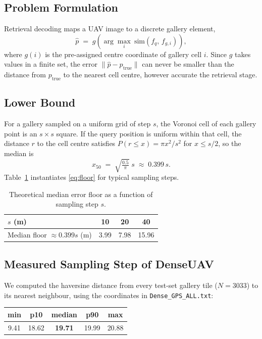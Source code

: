 \documentclass[journal]{IEEEtran}
\begin{document}
\subsection{Problem Formulation}
Retrieval decoding maps a UAV image to a discrete gallery element,
\begin{equation}
\hat{p} \;=\; g\!\left(\arg\max_{i}\ \mathrm{sim}\!\left(f_{q},\, f_{g,i}\right)\right),
\end{equation}
where $g(i)$ is the pre-assigned centre coordinate of gallery cell $i$. Since $g$ takes
values in a finite set, the error $\lVert \hat{p}-p_{\text{true}} \rVert$ can never be
smaller than the distance from $p_{\text{true}}$ to the nearest cell centre, however
accurate the retrieval stage.

\subsection{Lower Bound}
For a gallery sampled on a uniform grid of step $s$, the Voronoi cell of each gallery
point is an $s \times s$ square. If the query position is uniform within that cell, the
distance $r$ to the cell centre satisfies $P(r \le x) = \pi x^{2}/s^{2}$ for
$x \le s/2$, so the median is
\begin{equation}
x_{50} \;=\; \sqrt{\tfrac{0.5}{\pi}}\; s \;\approx\; 0.399\,s .
\label{eq:floor}
\end{equation}
Table~\ref{tab:floor} instantiates \eqref{eq:floor} for typical sampling steps.

\begin{table}[!t]
\centering
\caption{Theoretical median error floor as a function of sampling step $s$.}
\label{tab:floor}
\begin{tabular}{lccc}
\toprule
$s$ (m) & 10 & 20 & 40 \\
\midrule
Median floor $\approx 0.399s$ (m) & 3.99 & 7.98 & 15.96 \\
\bottomrule
\end{tabular}
\end{table}

\subsection{Measured Sampling Step of DenseUAV}
We computed the haversine distance from every test-set gallery tile ($N=3033$) to its
nearest neighbour, using the coordinates in \texttt{Dense\_GPS\_ALL.txt}:

\begin{center}
\begin{tabular}{ccccc}
\toprule
min & p10 & \textbf{median} & p90 & max \\
\midrule
9.41 & 18.62 & \textbf{19.71} & 19.99 & 20.88 \\
\bottomrule
\end{tabular}
\end{center}
\end{document}
